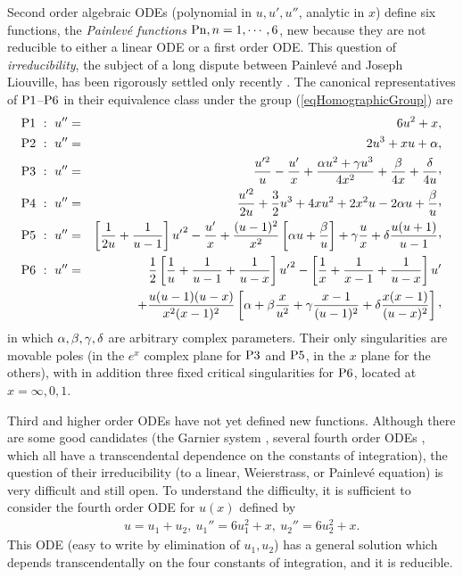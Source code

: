 \documentclass[10pt]{article}
\begin{document}
Second order algebraic ODEs (polynomial in $u,u',u''$, analytic in $x$)
define six functions, the
\textit{Painlev\'e functions} ${\rm Pn},n=1,\cdots,6$,
new because they are not reducible
to either a linear ODE or a first order ODE.
This question of \textit{irreducibility},
the subject of a long dispute between Painlev\'e and Joseph Liouville,
has been rigorously settled only recently \cite{U1990}.
The canonical representatives of ${\rm P1}$--${\rm P6}$ in their equivalence class
under the group (\ref{eqHomographicGroup}) are
\begin{eqnarray*}
\PI\ : \
u''
&=&
6 u^2 + x,
\\
\PII\ : \
u''
&=&
2 u^3 + x u + \alpha,
\\
\PIII\ %
: \
u''
&=&
\frac{u'^2}{u} - \frac{u'}{x} + \frac{\alpha u^2 + \gamma u^3}{4 x^2}
 + \frac{\beta}{4 x}
 + \frac{\delta}{4 u}\ccomma
\\
\PIV\ : \
u''
&=&
 \frac{u'^2}{2 u} +              \frac{3}{2} u^3 + 4 x u^2 + 2 x^2 u
- 2 \alpha u + \frac{\beta}{u}\ccomma
\\
\PV\ : \
u''
&=&
\left[\frac{1}{2 u} + \frac{1}{u-1} \right] {u'}^2
- \frac{u'}{x}
+ \frac{(u-1)^2}{x^2} \left[ \alpha u + \frac{\beta}{u} \right]
+ \gamma \frac{u}{x}
+ \delta \frac{u(u+1)}{u-1}\ccomma
\nonumber
\\
\PVI\ : \
u''
&=&
\frac{1}{2} \left[\frac{1}{u} + \frac{1}{u-1} + \frac{1}{u-x} \right] {u'}^2
- \left[\frac{1}{x} + \frac{1}{x-1} + \frac{1}{u-x} \right] u'
\\
& &
+ \frac{u (u-1) (u-x)}{x^2 (x-1)^2}
  \left[\alpha + \beta \frac{x}{u^2} + \gamma \frac{x-1}{(u-1)^2}
        + \delta \frac{x (x-1)}{(u-x)^2} \right]\ccomma
\end{eqnarray*}
in which $\alpha,\beta,\gamma,\delta$ are arbitrary complex parameters.
Their only singularities are movable poles
(in the $e^x$ complex plane for ${\rm P3}$ and ${\rm P5}$,
in the $x$ plane for the others),
with in addition three fixed critical singularities for ${\rm P6}$,
located at $x=\infty,0,1$.

Third and higher order ODEs \cite{ChazyThese,BureauMII,Cos2000a,Cos2000b}
have not yet defined new functions.
Although there are some good candidates
(the Garnier system \cite{GarnierThese},
several fourth order ODEs \cite{KS1998,Cos2000a},
which all have a transcendental dependence on the constants of integration),
the question of their irreducibility
(to a linear, Weierstrass, or Painlev\'e equation)
is very difficult and still open.
To understand the difficulty, it is sufficient to consider the 
fourth order ODE for $u(x)$ defined by
\begin{eqnarray}
& &
u=u_1+u_2,\
u_1''=6 u_1^2+x,\
u_2''=6 u_2^2+x.
\end{eqnarray}
This ODE (easy to write by elimination of $u_1,u_2$)
has a general solution which depends transcendentally on the four constants 
of integration, and it is reducible.
\end{document}
